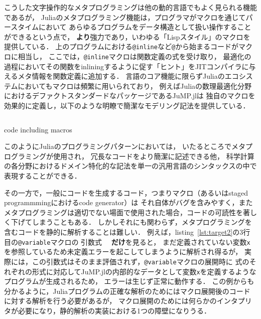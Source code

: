 こうした文字操作的なメタプログラミングは他の動的言語でもよく見られる機能であるが，
Juliaのメタプログラミング機能は，プログラマがマクロを通じてパースタイムにおいて
あらゆるプログラムをデータ構造として扱い操作することができるという点で，
\textbf{より}強力であり，いわゆる「Lispスタイル」のマクロを提供している．
上のプログラムにおける\verb|@inline|など\verb|@|から始まるコードがマクロに相当し，
ここでは，\verb|@inline|マクロは関数定義の式を受け取り，
最適化の過程においてその関数をinliningするように促す「ヒント」をJITコンパイラに与えるメタ情報を関数定義に追加する．
言語のコア機能に限らずJuliaのエコシステムにおいてもマクロは頻繁に用いられており，
例えばJuliaの数理最適化分野におけるデファクトスタンダードなパッケージであるJuMP.jl\cite{DunningHuchetteLubin2017}は
独自のマクロを効果的に定義し，以下のような明瞭で簡潔なモデリング記法を提供している．

\begin{listing}[ht]
  \inputminted[frame=lines, linenos, firstnumber=1, firstline=4, lastline=10]{julia}{src/jump.jl}
  \caption{code including macros}
  \label{lst:target2}
\end{listing}

このようにJuliaのプログラミングパターンにおいては，
いたるところでメタプログラミングが使用され\footnotemark，
冗長なコードをより簡潔に記述できる他，
科学計算の各分野におけるドメイン特化的な記法を単一の汎用言語のシンタックスの中で表現することができる\cite{jeff-phd}．


その一方で，一般にコードを生成するコード，つまりマクロ（あるいはstaged programmmingにおけるcode generator）は
それ自体がバグを含みやすく，またメタプログラミングは適切でない場面で使用された場合，コードの可読性を著しく下げてしまうこともある．
しかしそれにも関わらず，メタプログラミングを含むコードを静的に解析することは難しい．
例えば，listing~\ref{lst:target2}の3行目の\verb|@variable|マクロの
引数式　 \textbf{だけ}を見ると，
まだ定義されていない変数\verb|x|を参照しているため未定義エラーを起こしてしまうように解析され得るが，
実際には，この引数式はそのまま評価されず，\verb|@variable|マクロの展開時に
式のそれぞれの形式に対応してJuMP.jlの内部的なデータとして変数\verb|x|を定義するようなプログラムが生成されるため，
エラーは生じず正常に動作する．
この例からも分かるように，Juliaプログラムの正確な解析のためにはマクロ展開後のコードに対する解析を行う必要があるが，
マクロ展開のためには何らかのインタプリタが必要になり，静的解析の実装における1つの障壁になりうる．\footnotemark

